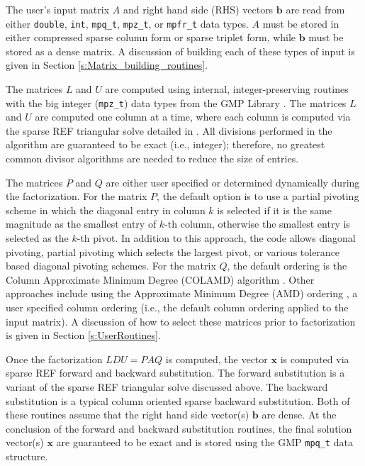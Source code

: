 \documentclass[12pt]{article}
\theoremstyle{definition}
\begin{document}
The user's input matrix $A$ and right hand side (RHS) vectors $\mathbf{b}$ are
read from either \verb|double|, \verb|int|, \verb|mpq_t|, \verb|mpz_t|, or
\verb|mpfr_t| data types. $A$ must be stored in either compressed sparse column
form or sparse triplet form, while $\mathbf{b}$ must be stored as a dense
matrix. A discussion of building each of these types of input is given in
Section \ref{s:Matrix_building_routines}.

The matrices $L$ and $U$ are computed using internal, integer-preserving
routines with the big integer (\verb|mpz_t|) data types from the GMP Library
\cite{granlund2015gnu}. The matrices $L$ and $U$ are computed one column at a
time, where each column is computed via the sparse REF triangular solve
detailed in \cite{lourenco2019exact}. All divisions performed in the algorithm
are guaranteed to be exact (i.e., integer); therefore, no greatest common
divisor algorithms are needed to reduce the size of entries.

The matrices $P$ and $Q$ are either user specified or determined dynamically
during the factorization. For the matrix $P$, the default option is to use a
partial pivoting scheme in which the diagonal entry in column $k$ is selected
if it is the same magnitude as the smallest entry of $k$-th column, otherwise
the smallest entry is selected as the $k$-th pivot. In addition to this
approach, the code allows diagonal pivoting, partial pivoting which selects the
largest pivot, or various tolerance based diagonal pivoting schemes. For the
matrix $Q$, the default ordering is the Column Approximate Minimum Degree
(COLAMD) algorithm \cite{davis2004algorithmcolamd,davis2004column}. Other
approaches include using the Approximate Minimum Degree (AMD) ordering
\cite{amestoy1996approximate,amestoy2004algorithmamd}, a user specified column
ordering (i.e., the default column ordering applied to the input matrix). A
discussion of how to select these matrices prior to factorization is given in
Section \ref{s:UserRoutines}.

Once the factorization $L D U = P A Q $ is computed, the vector $\mathbf{x}$ is
computed via sparse REF forward and backward substitution. The forward
substitution is a variant of the sparse REF triangular solve discussed above.
The backward substitution is a typical column oriented sparse backward
substitution. Both of these routines assume that the right hand side vector(s)
$\mathbf{b}$ are dense. At the conclusion of the forward and backward
substitution routines, the final solution vector(s) $\mathbf{x}$ are guaranteed
to be exact and is stored using the GMP \verb|mpq_t| data structure.
\end{document}

